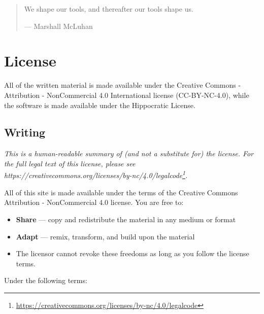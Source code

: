 \documentclass[krantzl]{krantz}
\newcommand{\hreffoot}[2]{{#1}\footnote{\href{#2}{#2}}}
\begin{document}
\begin{quotation}


We shape our tools, and thereafter our tools shape us.


— Marshall McLuhan

\end{quotation}


\appendix
\chapter{License}\label{license}

All of the written material is made available under the Creative
Commons - Attribution - NonCommercial 4.0 International license (CC-BY-NC-4.0),
while the software is made available under the Hippocratic License.

\section*{Writing}


\emph{This is a human-readable summary of (and not a substitute for) the license.
For the full legal text of this license, please see
\hreffoot{https://creativecommons.org/licenses/by-nc/4.0/legalcode}{https://creativecommons.org/licenses/by-nc/4.0/legalcode}.}


All of this site is made available under the terms of the Creative Commons
Attribution - NonCommercial 4.0 license. You are free to:

\begin{itemize}

\item 

\textbf{Share} — copy and redistribute the material in any medium or format



\item 

\textbf{Adapt} — remix, transform, and build upon the material



\item 

The licensor cannot revoke these freedoms as long as you follow the license
    terms.



\end{itemize}


\noindent Under the following terms:
\end{document}
